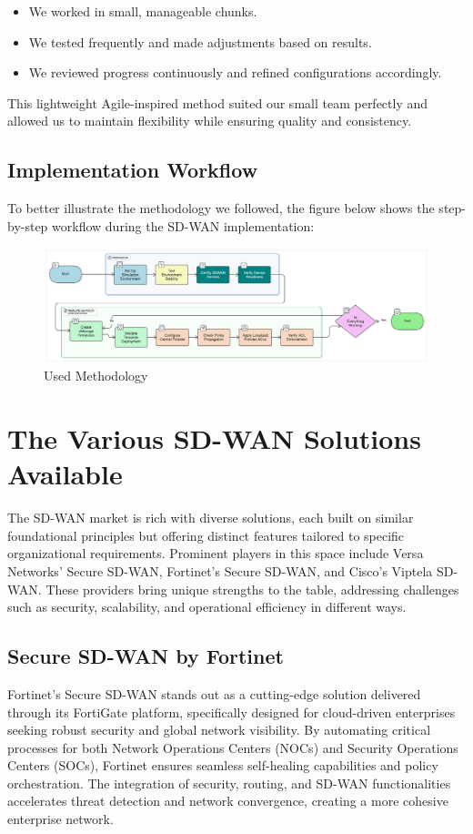 \documentclass[12pt,english]{report}
\begin{document}
\begin{itemize}
    \item We worked in small, manageable chunks.
    \item We tested frequently and made adjustments based on results.
    \item We reviewed progress continuously and refined configurations accordingly.
\end{itemize}

This lightweight Agile-inspired method suited our small team perfectly and allowed us to maintain flexibility while ensuring quality and consistency\cite{ref7}.

\subsection{Implementation Workflow}

To better illustrate the methodology we followed, the figure below shows the step-by-step workflow during the SD-WAN implementation:

\begin{figure}[H]
    \centering
    \includegraphics[width= 1\textwidth]{chapter1/diagram-export-17-05-2025-18_04_52.png}
    \caption{Used Methodology}
    \label{fig: Used Methodology}
\end{figure}
\section{The Various SD-WAN Solutions Available}
The SD-WAN market is rich with diverse solutions, each built on similar foundational principles but offering distinct features tailored to specific organizational requirements. Prominent players in this space include Versa Networks’ Secure SD-WAN, Fortinet’s Secure SD-WAN, and Cisco’s Viptela SD-WAN. These providers bring unique strengths to the table, addressing challenges such as security, scalability, and operational efficiency in different ways.

\subsection{Secure SD-WAN by Fortinet}
Fortinet’s Secure SD-WAN stands out as a cutting-edge solution delivered through its FortiGate platform, specifically designed for cloud-driven enterprises seeking robust security and global network visibility. By automating critical processes for both Network Operations Centers (NOCs) and Security Operations Centers (SOCs), Fortinet ensures seamless self-healing capabilities and policy orchestration. The integration of security, routing, and SD-WAN functionalities accelerates threat detection and network convergence, creating a more cohesive enterprise network.
\end{document}
